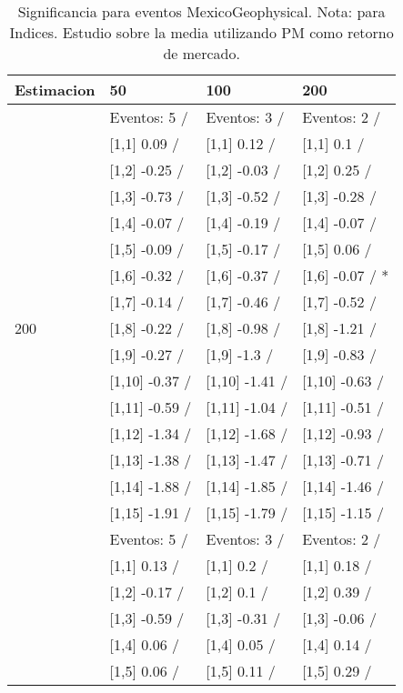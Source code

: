 \begin{table}

\caption{Significancia para eventos MexicoGeophysical. Nota: para Indices. Estudio sobre la media utilizando PM como retorno de mercado.}
\centering
\begin{tabular}[t]{llll}
\toprule
Estimacion & 50 & 100 & 200\\
\midrule
 & Eventos:  5 / & Eventos:  3 / & Eventos:  2 /\\
 & {}[1,1] 0.09  / & {}[1,1] 0.12  / & {}[1,1] 0.1  /\\
 & {}[1,2] -0.25  / & {}[1,2] -0.03  / & {}[1,2] 0.25  /\\
 & {}[1,3] -0.73  / & {}[1,3] -0.52  / & {}[1,3] -0.28  /\\
 & {}[1,4] -0.07  / & {}[1,4] -0.19  / & {}[1,4] -0.07  /\\
\addlinespace
 & {}[1,5] -0.09  / & {}[1,5] -0.17  / & {}[1,5] 0.06  /\\
 & {}[1,6] -0.32  / & {}[1,6] -0.37  / & {}[1,6] -0.07  / *\\
 & {}[1,7] -0.14  / & {}[1,7] -0.46  / & {}[1,7] -0.52  /\\
200 & {}[1,8] -0.22  / & {}[1,8] -0.98  / & {}[1,8] -1.21  /\\
 & {}[1,9] -0.27  / & {}[1,9] -1.3  / & {}[1,9] -0.83  /\\
\addlinespace
 & {}[1,10] -0.37  / & {}[1,10] -1.41  / & {}[1,10] -0.63  /\\
 & {}[1,11] -0.59  / & {}[1,11] -1.04  / & {}[1,11] -0.51  /\\
 & {}[1,12] -1.34  / & {}[1,12] -1.68  / & {}[1,12] -0.93  /\\
 & {}[1,13] -1.38  / & {}[1,13] -1.47  / & {}[1,13] -0.71  /\\
 & {}[1,14] -1.88  / & {}[1,14] -1.85  / & {}[1,14] -1.46  /\\
\addlinespace
 & {}[1,15] -1.91  / & {}[1,15] -1.79  / & {}[1,15] -1.15  /\\
 & Eventos:  5 / & Eventos:  3 / & Eventos:  2 /\\
 & {}[1,1] 0.13  / & {}[1,1] 0.2  / & {}[1,1] 0.18  /\\
 & {}[1,2] -0.17  / & {}[1,2] 0.1  / & {}[1,2] 0.39  /\\
 & {}[1,3] -0.59  / & {}[1,3] -0.31  / & {}[1,3] -0.06  /\\
\addlinespace
 & {}[1,4] 0.06  / & {}[1,4] 0.05  / & {}[1,4] 0.14  /\\
 & {}[1,5] 0.06  / & {}[1,5] 0.11  / & {}[1,5] 0.29  /\\

\end{tabular}
\end{table}
